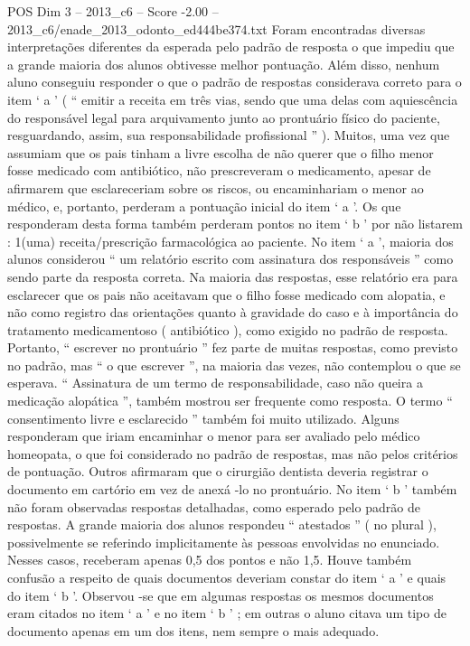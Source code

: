 \begin{textsample}{POS Dim 3 – 2013\_c6 – Score -2.00 – 2013\_c6/enade\_2013\_odonto\_ed444be374.txt}
Foram encontradas diversas interpretações diferentes da esperada pelo padrão de resposta o que impediu que a grande maioria dos alunos obtivesse melhor pontuação.
Além disso, nenhum aluno conseguiu responder o que o padrão de respostas considerava correto para o item ‘ a ’ ( “ emitir a receita em três vias, sendo que uma delas com aquiescência do responsável legal para arquivamento junto ao prontuário físico do paciente, resguardando, assim, sua responsabilidade profissional ” ).
Muitos, uma vez que assumiam que os pais tinham a livre escolha de não querer que o filho menor fosse medicado com antibiótico, não prescreveram o medicamento, apesar de afirmarem que esclareceriam sobre os riscos, ou encaminhariam o menor ao médico, e, portanto, perderam a pontuação inicial do item ‘ a ’.
Os que responderam desta forma também perderam pontos no item ‘ b ’ por não listarem : 1(uma) receita/prescrição farmacológica ao paciente.
No item ‘ a ’, maioria dos alunos considerou “ um relatório escrito com assinatura dos responsáveis ” como sendo parte da resposta correta.
Na maioria das respostas, esse relatório era para esclarecer que os pais não aceitavam que o filho fosse medicado com alopatia, e não como registro das orientações quanto à gravidade do caso e à importância do tratamento medicamentoso ( antibiótico ), como exigido no padrão de resposta.
Portanto, “ escrever no prontuário ” fez parte de muitas respostas, como previsto no padrão, mas “ o que escrever ”, na maioria das vezes, não contemplou o que se esperava. “ Assinatura de um termo de responsabilidade, caso não queira a medicação alopática ”, também mostrou ser frequente como resposta.
O termo “ consentimento livre e esclarecido ” também foi muito utilizado.
Alguns responderam que iriam encaminhar o menor para ser avaliado pelo médico homeopata, o que foi considerado no padrão de respostas, mas não pelos critérios de pontuação.
Outros afirmaram que o cirurgião dentista deveria registrar o documento em cartório em vez de anexá -lo no prontuário.
No item ‘ b ’ também não foram observadas respostas detalhadas, como esperado pelo padrão de respostas.
A grande maioria dos alunos respondeu “ atestados ” ( no plural ), possivelmente se referindo implicitamente às pessoas envolvidas no enunciado.
Nesses casos, receberam apenas 0,5 dos pontos e não 1,5.
Houve também confusão a respeito de quais documentos deveriam constar do item ‘ a ’ e quais do item ‘ b ’.
Observou -se que em algumas respostas os mesmos documentos eram citados no item ‘ a ’ e no item ‘ b ’ ; em outras o aluno citava um tipo de documento apenas em um dos itens, nem sempre o mais adequado.

\end{textsample}
